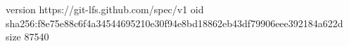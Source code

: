 version https://git-lfs.github.com/spec/v1
oid sha256:f8e75e88c6f4a34544695210e30f94e8bd18862eb43df79906eee392184a622d
size 87540
